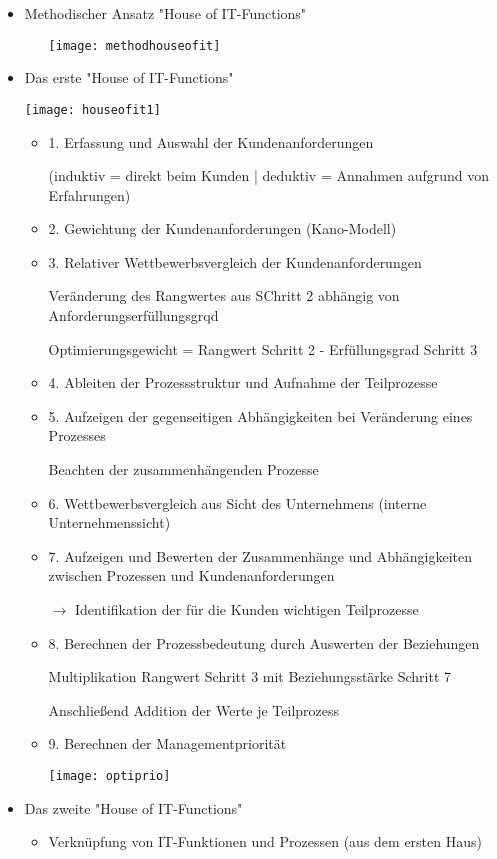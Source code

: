 \begin{itemize}
\item Methodischer Ansatz "House of IT-Functions"
	\begin{itemize}
	\item[] \texttt{[image: methodhouseofit]}
	\end{itemize}
	\item Das erste "House of IT-Functions"
	\item[] \texttt{[image: houseofit1]}
		\begin{itemize}
		\item 1. Erfassung und Auswahl der Kundenanforderungen 
		\item[] (induktiv = direkt beim Kunden | deduktiv = Annahmen aufgrund von Erfahrungen)
		\item 2. Gewichtung der Kundenanforderungen (Kano-Modell)
		\item 3. Relativer Wettbewerbsvergleich der Kundenanforderungen
		\item[] Veränderung des Rangwertes aus SChritt 2 abhängig von Anforderungserfüllungsgrqd
		\item[] Optimierungsgewicht = Rangwert Schritt 2 - Erfüllungsgrad Schritt 3
		\item 4. Ableiten der Prozessstruktur und Aufnahme der Teilprozesse
		\item 5. Aufzeigen der gegenseitigen Abhängigkeiten bei Veränderung eines Prozesses
		\item[] Beachten der zusammenhängenden Prozesse
		\item 6. Wettbewerbsvergleich aus Sicht des Unternehmens (interne Unternehmenssicht)
		\item 7. Aufzeigen und Bewerten der Zusammenhänge und Abhängigkeiten zwischen Prozessen und Kundenanforderungen		
		\item[$\rightarrow$] Identifikation der für die Kunden wichtigen Teilprozesse
		\item 8. Berechnen der Prozessbedeutung durch Auswerten der Beziehungen
		\item[] Multiplikation Rangwert Schritt 3 mit Beziehungsstärke Schritt 7
		\item[] Anschließend Addition der Werte je Teilprozess
		\item 9. Berechnen der Managementpriorität
		\item[] \texttt{[image: optiprio]}
		
		\end{itemize}
	
	\item Das zweite "House of IT-Functions"
		\begin{itemize}
		\item Verknüpfung von IT-Funktionen und Prozessen (aus dem ersten Haus)
		\end{itemize}
		
\end{itemize}

